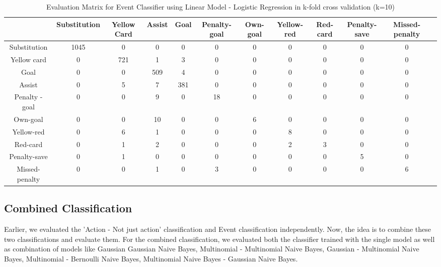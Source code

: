 \documentclass[11pt,letterpaper]{article}
\begin{document}
\begin{table*}
\caption{Evaluation Matrix for Event Classifier using Linear Model - Logistic Regression in k-fold cross validation (k=10)} \label{Evalution Matrix for Event Classifier using Linear Model - Logistic Regression in k-fold cross validation (k=10)}
\begin{center}
\begin{adjustbox}{width=1\textwidth}
\begin{tabular}{ |c|c|c|c|c|c|c|c|c|c|c|c| } 
 \hline
  & Substitution & Yellow Card &  Assist & Goal & Penalty-goal &  Own-goal &Yellow-red & Red-card  & Penalty-save & Missed-penalty\\ 
 \hline
 Substitution & 1045 & 0 & 0 & 0 & 0 & 0 & 0 & 0 & 0 & 0 \\ 
 Yellow card & 0 & 721 & 1 & 3 & 0 & 0 & 0 & 0 & 0 & 0 \\ 
  Goal & 0 & 0 & 509 & 4 & 0 & 0 & 0 & 0 & 0 & 0 \\
 Assist & 0 & 5 & 7 & 381 & 0 & 0 & 0 & 0 & 0 & 0 \\
  Penalty - goal & 0 & 0 & 9 & 0 & 18 & 0 & 0 & 0 & 0 & 0 \\
 Own-goal  & 0 & 0 & 10 & 0 & 0 & 6 & 0 & 0 & 0 & 0 \\
  Yellow-red & 0 & 6 & 1 & 0 & 0 & 0 & 8 & 0 & 0 & 0 \\
 Red-card & 0 & 1 & 2 & 0 & 0 & 0 & 2 & 3 & 0 & 0 \\ 
  Penalty-save & 0 & 1 & 0 & 0 & 0  & 0 & 0 & 0  & 5 & 0 \\ 
  Missed-penalty & 0 & 0 & 1 & 0 & 3 & 0 & 0 & 0 & 0 & 6 \\ 
 \hline
\end{tabular}
\end{adjustbox}
\end{center}

\end{table*}

\subsection{Combined Classification}
Earlier, we evaluated the 'Action - Not just action' classification and Event classification independently. Now, the idea is to combine these two classifications and evaluate them. For the combined classification, we evaluated both the classifier trained with the single model  as well as combination of models like Gaussian  Gaussian Naive Bayes, Multinomial - Multinomial Naive Bayes, Gaussian - Multinomial Naive Bayes, Multinomial - Bernoulli Naive Bayes, Multinomial Naive Bayes - Gaussian Naive Bayes. 
\end{document}
